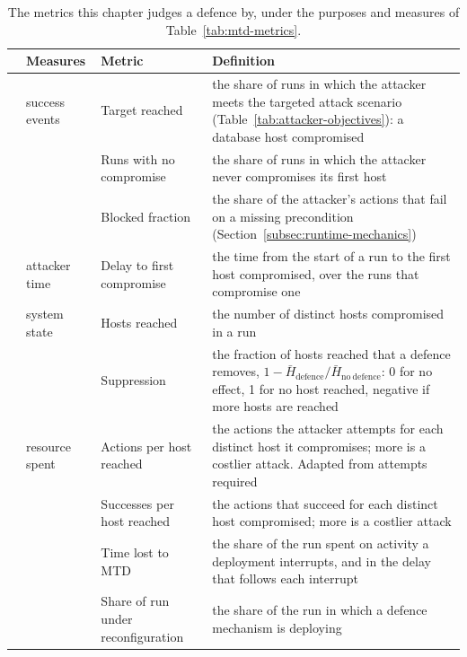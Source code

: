 \begin{table}[htbp]
  \centering
  \caption[The metrics]{The metrics this chapter judges a defence by, under the purposes and measures of Table~\ref{tab:mtd-metrics}.}
  \label{tab:metrics}
  \tablestyle\setlength{\tabcolsep}{4pt}
  \begin{tabular}{@{}cP{1.9cm}P{3.0cm}P{9.4cm}@{}}
    \toprule
    & Measures & Metric & Definition \\
    \midrule
    & success events & Target reached & the share of runs in which the attacker meets the targeted attack scenario (Table~\ref{tab:attacker-objectives}): a database host compromised\\
    & & Runs with no compromise & the share of runs in which the attacker never compromises its first host\\
    & & Blocked fraction & the share of the attacker's actions that fail on a missing precondition (Section~\ref{subsec:runtime-mechanics})\\
    & attacker time & Delay to first compromise & the time from the start of a run to the first host compromised, over the runs that compromise one\\
    & system state & Hosts reached & the number of distinct hosts compromised in a run\\
     & & Suppression & the fraction of hosts reached that a defence removes, $1 - \bar{H}_{\mathrm{defence}} / \bar{H}_{\mathrm{no\ defence}}$: 0 for no effect, 1 for no host reached, negative if more hosts are reached\\
    \midrule
    & resource spent & Actions per host reached & the actions the attacker attempts for each distinct host it compromises; more is a costlier attack. Adapted from attempts required \citep{brown2023} \\
    & & Successes per host reached & the actions that succeed for each distinct host compromised; more is a costlier attack\\
    & & Time lost to MTD & the share of the run spent on activity a deployment interrupts, and in the delay that follows each interrupt\\
     & & Share of run under reconfiguration & the share of the run in which a defence mechanism is deploying\\
    \bottomrule
  \end{tabular}
\end{table}
